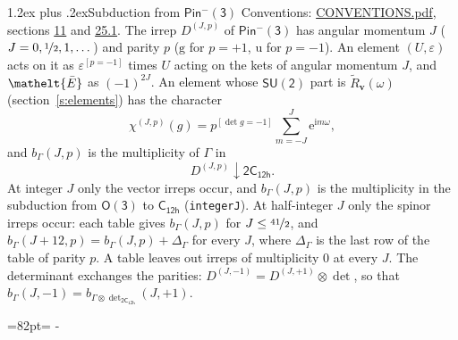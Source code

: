 \documentclass[10pt,a4paper]{article}
\makeatletter
\renewcommand\section{\@startsection{section}{1}{\z@}{-3ex plus -1ex minus -.2ex}%
  {1.2ex plus .2ex}{\normalfont\large\sffamily\bfseries\color{parttitle}}}
\newcommand{\needspace}[1]{\par\penalty-100\begingroup\dimen0=#1\relax\dimen2=\pagegoal
  \advance\dimen2-\pagetotal\ifdim\dimen0>\dimen2\relax\ifdim\dimen2>0pt\vfil\break\fi\fi
  \endgroup}
\numberwithin{equation}{section}
\newcommand{\eltfont}[1]{{\let\sigma\eltsigma\mathelt{#1}}}
\newcommand{\grp}[1]{\mathsf{#1}}
\newcommand{\elt}[1]{\eltfont{#1}}
\newcommand{\ptag}[1]{\mathrm{#1}}
\newcommand{\iverson}[1]{[#1]}
\newcommand{\restr}[2]{#1\!\downarrow#2}
\newcommand{\vv}{\mathbf{v}}
\newcommand{\iunit}{\mathrm{i}}
\newcommand{\expe}{\mathrm{e}}
\newcommand{\irrJp}[2]{D^{(#1,#2)}}
\newcommand{\irrprod}{\otimes}
\newcommand{\barred}[1]{\bar{#1}}
\newcommand{\lift}[1]{\tilde{#1}}
\makeatother
\begin{document}
\section{Subduction from \texorpdfstring{$\grp{Pin^{-}(3)}$}{Pin(3)}}\label{s:subduction_parent}
Conventions: \href{../../CONVENTIONS.pdf}{CONVENTIONS.pdf}, sections \href{../../../rotation/CONVENTIONS.pdf\#conv.11}{11} and \href{../../CONVENTIONS.pdf\#conv.25.1}{25.1}.
\leavevmode\label{n:index.J}\label{n:index.parity}\label{n:irrep.o3}The irrep $\irrJp{J}{p}$ of \href{Pinminus3.pdf}{$\grp{Pin^{-}(3)}$} has angular momentum $J$ ($J = 0, \nicefrac{1}{2}, 1, \dots$) and parity $p$ ($\ptag{g}$ for $p = +1$, $\ptag{u}$ for $p = -1$). An element $(U, \varepsilon)$ acts on it as $\varepsilon^{[p = -1]}$ times $U$ acting on the kets of angular momentum $J$, and $\elt{\barred{E}}$ as $(-1)^{2J}$. \label{n:function.character.parent}\label{n:function.multiplicity}An element whose $\grp{SU(2)}$ part is $\lift{R}_{\vv}(\omega)$ (section~\ref{s:elements}) has the character
\begin{equation}\label{e:chi}\chi^{(J,p)}(g) = p^{\iverson{\det g = -1}}\sum_{m=-J}^{J} \expe^{\iunit m\omega},\end{equation}
and $b_\Gamma(J, p)$ is the multiplicity of $\Gamma$ in
\begin{equation}\label{e:parent}\restr{\irrJp{J}{p}}{\grp{2C_{12h}}}.\end{equation}
At integer $J$ only the vector irreps occur, and $b_\Gamma(J, p)$ is the multiplicity in the subduction from $\grp{O(3)}$ to \href{../../../rotation/data/pdf/C12h.pdf}{$\grp{C_{12h}}$} (\texttt{integerJ}). \label{n:index.increment}At half-integer $J$ only the spinor irreps occur: each table gives $b_\Gamma(J, p)$ for $J \le \nicefrac{41}{2}$, and $b_\Gamma(J + 12, p) = b_\Gamma(J, p) + \Delta_\Gamma$ for every $J$, where $\Delta_\Gamma$ is the last row of the table of parity $p$. A table leaves out irreps of multiplicity 0 at every $J$.
\leavevmode\label{n:operator.determinant.character}The determinant exchanges the parities: $\irrJp{J}{-1} = \irrJp{J}{+1} \irrprod \det$, so that $b_\Gamma(J, -1) = b_{\Gamma \irrprod \det_{\grp{2C_{12h}}}}(J, +1)$.
\needspace{82pt}
\end{document}
